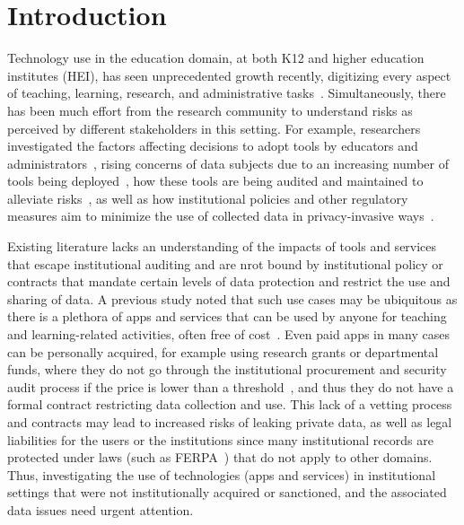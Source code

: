 \section{Introduction}

Technology use in the education domain, at both K12 and higher education institutes (HEI), has seen unprecedented growth recently, digitizing every aspect of teaching, learning, research, and administrative tasks~\cite{datafication-HE, constant-expanding-classroom, edtech-ccs2024, chanensonUncoveringPrivacySecurityK12CHI23}. %
Simultaneously, there has been much effort from the research community to understand \SP risks as perceived by different stakeholders in this setting. For example, researchers investigated the factors affecting decisions to adopt tools by educators and administrators~\cite{chanensonUncoveringPrivacySecurityK12CHI23, balashEducatorsPerspectives2023, shiojiItsBeenLovely}, rising \SP concerns of data subjects due to an increasing number of tools being deployed~\cite{edtechPETS23, studentPrivacySchoolDevices, examining-examiners, yang_discovering_2024, radway_investigation_2024}, how these tools are being audited and maintained to alleviate \SP risks~\cite{edtech-ccs2024, chanensonUncoveringPrivacySecurityK12CHI23}, as well as how institutional policies and other regulatory measures aim to minimize the use of collected data in privacy-invasive ways~\cite{radway_investigation_2024, edtech-ccs2024}. 

Existing literature lacks an understanding of the \SP impacts of tools and services that escape institutional auditing and are nrot bound by institutional policy or contracts that mandate certain levels of data protection and restrict the use and sharing of data. A previous study noted that such use cases may be ubiquitous as there is a plethora of apps and services that can be used by anyone for teaching and learning-related activities, often free of cost~\cite{edtech-ccs2024}. Even paid apps in many cases can be personally acquired, for example using research grants or departmental funds, where they do not go through the institutional procurement and security audit process if the price is lower than a threshold~\cite{edtech-ccs2024}, and thus they do not have a formal contract restricting data collection and use. This lack of a vetting process and contracts may lead to increased risks of leaking private data, as well as legal liabilities for the users or the institutions since many institutional records are protected under laws (such as FERPA~\cite{ferpa}) that do not apply to other domains. Thus, investigating the use of technologies (apps and services) in institutional settings that were not institutionally acquired or sanctioned, and the associated data \SP issues need urgent attention.

